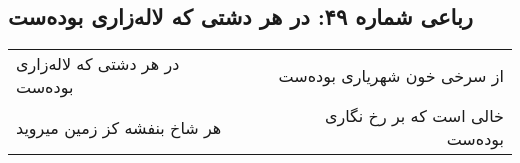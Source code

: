 \begin{center}
\section*{رباعی شماره ۴۹: در هر دشتی که لاله‌زاری بوده‌ست}
\label{sec:sh049}
\begin{longtable}{l p{0.5cm} r}
در هر دشتی که لاله‌زاری بوده‌ست
&&
از سرخی خون شهریاری بوده‌ست
\\
هر شاخ بنفشه کز زمین میروید
&&
خالی است که بر رخ نگاری بوده‌ست
\\
\end{longtable}
\end{center}
